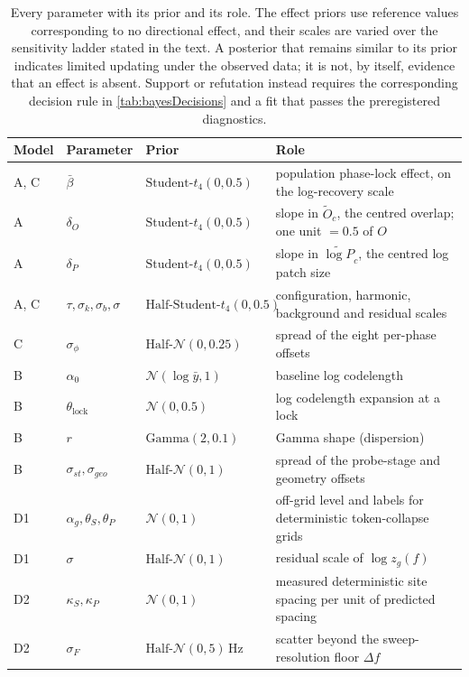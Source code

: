 \begin{table}[!t]
    \centering
    \small
    \begin{tabular}{@{}lllp{4.9cm}@{}}
        \toprule
        \textbf{Model} & \textbf{Parameter} & \textbf{Prior} & \textbf{Role} \\
        \midrule
        A, C & $\bar\beta$                     & $\text{Student-}t_4(0,0.5)$      & population phase-lock effect, on the log-recovery scale \\
        A    & $\delta_O$                      & $\text{Student-}t_4(0,0.5)$      & slope in $\widetilde O_c$, the centred overlap; one unit $=0.5$ of $O$ \\
        A    & $\delta_P$                      & $\text{Student-}t_4(0,0.5)$      & slope in $\widetilde{\log P}_c$, the centred log patch size \\
        A, C & $\tau,\sigma_k,\sigma_b,\sigma$  & $\text{Half-Student-}t_4(0,0.5)$ & configuration, harmonic, background and residual scales \\
        C    & $\sigma_\phi$                   & $\text{Half-}\mathcal N(0,0.25)$ & spread of the eight per-phase offsets \\
        B    & $\alpha_0$                      & $\mathcal N(\log \bar y, 1)$     & baseline log codelength \\
        B    & $\theta_{\mathrm{lock}}$        & $\mathcal N(0,0.5)$              & log codelength expansion at a lock \\
        B    & $r$                             & $\text{Gamma}(2,0.1)$            & Gamma shape (dispersion) \\
        B    & $\sigma_{st},\sigma_{geo}$      & $\text{Half-}\mathcal N(0,1)$    & spread of the probe-stage and geometry offsets \\
        D1   & $\alpha_g,\theta_S,\theta_P$    & $\mathcal N(0,1)$                & off-grid level and labels for deterministic token-collapse grids \\
        D1   & $\sigma$                        & $\text{Half-}\mathcal N(0,1)$    & residual scale of $\log z_g(f)$ \\
        D2   & $\kappa_S,\kappa_P$             & $\mathcal N(0,1)$                & measured deterministic site spacing per unit of predicted spacing \\
        D2   & $\sigma_F$                      & $\text{Half-}\mathcal N(0,5)$\,Hz & scatter beyond the sweep-resolution floor $\Delta f$ \\
        \bottomrule
    \end{tabular}
    \caption{Every parameter with its prior and its role. The effect priors use reference values corresponding to no directional effect, and their scales are varied over the sensitivity ladder stated in the text. A posterior that remains similar to its prior indicates limited updating under the observed data; it is not, by itself, evidence that an effect is absent. Support or refutation instead requires the corresponding decision rule in \autoref{tab:bayesDecisions} and a fit that passes the preregistered diagnostics.}
    \label{tab:bayesPriors}
\end{table}
